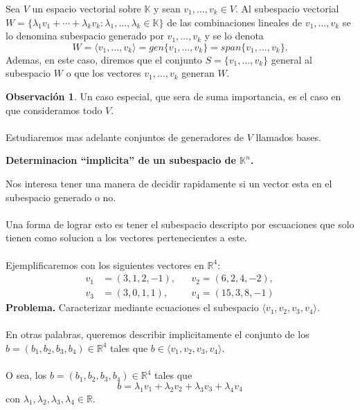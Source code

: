 \documentclass{article}
\theoremstyle{definition}
\theoremstyle{definition}
\newtheorem*{obs}{Observación}
\theoremstyle{remark}
\begin{document}
\begin{defi}
  Sea $V$ un espacio vectorial sobre $\mathbb{K}$ y sean $v_1, \dots ,v_k \in V$. Al subespacio vectorial $W=\{\lambda_1 v_1 + \cdots + \lambda_k v_k : \lambda_1, \dots ,\lambda_k \in \mathbb{K}\}$ de las combinaciones lineales de $v_1, \dots ,v_k$ se lo denomina subespacio generado por $v_1, \dots ,v_k$ y se lo denota \[
    W=\langle v_1, \dots ,v_k \rangle =gen\{v_1, \dots , v_k\}=span \{v_1, \dots ,v_k\}.
  \]
  Ademas, en este caso, diremos que el conjunto $S=\{v_1, \dots ,v_k\}$ general al subespacio $W$ o que los vectores $v_1,\dots, v_k$ generan $W$.
\end{defi}
\begin{obs}
  Un caso especial, que sera de suma importancia, es el caso en que consideramos todo $V$. \\\\
  Estudiaremos mas adelante conjuntos de generadores de $V$ llamados bases.
\end{obs}
\begin{center}
  \textbf{Determinacion ``implicita'' de un subespacio de $\mathbb{K}^n$.}
\end{center}
Nos interesa tener una manera de decidir rapidamente si un vector esta en el subespacio generado o no. \\\\
Una forma de lograr esto es tener el subespacio descripto por escuaciones que solo tienen como solucion a los vectores pertenecientes a este.\\\\
Ejemplificaremos con los siguientes vectores en $\mathbb{R}^4$: \[
  \begin{aligned}
    v_1&= (3,1,2,-1), && v_2=(6,2,4,-2), \\
    v_3&=(3,0,1,1), && v_4=(15,3,8,-1)
  \end{aligned}
\]
\textbf{Problema.} Caracterizar mediante ecuaciones el subespacio $\langle v_1,v_2,v_3,v_4 \rangle$. \\\\ 
En otras palabras, queremos describir implicitamente el conjunto de los \\$b=(b_1,b_2,b_3,b_4) \in \mathbb{R}^4$ tales que $b \in \langle v_1, v_2 ,v_3 ,v_4 \rangle$. \\\\ 
O sea, los $b=(b_1,b_2,b_3,b_4) \in \mathbb{R}^4$ tales que \[
  b=\lambda_1 v_1 + \lambda_2 v_2 + \lambda_3 v_3 + \lambda_4 v_4 \tag{*}
\]
con $\lambda_1, \lambda_2, \lambda_3, \lambda_4 \in \mathbb{R}$. \pagebreak
\end{document}

